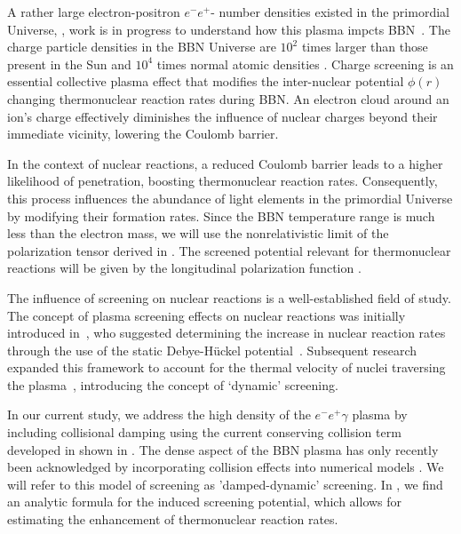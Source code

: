 A rather large electron-positron $e^-e^+$- number densities existed in the primordial Universe, , work is in progress to understand how this plasma impcts BBN~\cite{Wang:2010px,Hwang:2021kno,Rafelski:2023emw}. The charge particle densities in the BBN Universe are $10^2$ times larger than those present in the Sun \cite{Bahcall:2001smc} and $10^4$ times normal atomic densities \cite{Grayson:2023flr}. Charge screening is an essential collective plasma effect that modifies the inter-nuclear potential $\phi(r)$ changing thermonuclear reaction rates during BBN. An electron cloud around an ion's charge effectively diminishes the influence of nuclear charges beyond their immediate vicinity, lowering the Coulomb barrier. 

In the context of nuclear reactions, a reduced Coulomb barrier leads to a higher likelihood of penetration, boosting thermonuclear reaction rates. Consequently, this process influences the abundance of light elements in the primordial Universe by modifying their formation rates. Since the BBN temperature range is much less than the electron mass, we will use the nonrelativistic limit of the polarization tensor derived in . The screened potential relevant for thermonuclear reactions will be given by the longitudinal polarization function .

The influence of screening on nuclear reactions is a well-established field of study. The concept of plasma screening effects on nuclear reactions was initially introduced in~\cite{Salpeter:1954nc}, who suggested determining the increase in nuclear reaction rates through the use of the static Debye-H{\"u}ckel potential~\cite{Debye_1923a,Debye_1923b,Salpeter:1969apj,Famiano:2016hhs}. Subsequent research expanded this framework to account for the thermal velocity of nuclei traversing the plasma~\cite{Hwang:2021kno,Carraro:1988apj,Gruzinov:1997as,Opher:1999jh,Yao:2016cjs}, introducing the concept of `dynamic' screening. 

In our current study, we address the high density of the $e^-e^+\gamma$ plasma by including collisional damping using the current conserving collision term developed in \cite{Formanek:2021blc} shown in . The dense aspect of the BBN plasma has only recently been acknowledged by incorporating collision effects into numerical models \cite{Sasankan:2019oee,Kedia:2020xdc}. We will refer to this model of screening as 'damped-dynamic' screening. In \cite{Grayson:2023flr}, we find an analytic formula for the induced screening potential, which allows for estimating the enhancement of thermonuclear reaction rates.


